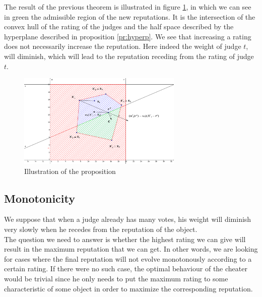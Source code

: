 \documentclass[12pt,a4paper]{article}
\begin{document}
The result of the previous theorem is illustrated in figure \ref{hyperp}, in which we can see in green the admissible region of the new reputations. It is the intersection of the convex hull of the rating of the judges and the half space described by the hyperplane described in proposition \ref{pr:hyperp}. We see that increasing a rating does not necessarily increase the reputation. Here indeed the weight of judge $t$, will diminish, which will lead to the reputation receding from the rating of judge $t$.

\begin{figure}[h!]
\centering
\includegraphics[width = 0.7\textwidth]{geogebra/Hyperplane.png}
\caption{\label{hyperp}Illustration of the proposition}
\end{figure}
\FloatBarrier

\newpage
\subsection{Monotonicity}
We suppose that when a judge already has many votes, his weight will diminish very slowly when he recedes from the reputation of the object.\\
The question we need to answer is whether the highest rating we can give will result in the maximum reputation that we can get. In other words, we are looking for cases where the final reputation will not evolve monotonously according to a certain rating. If there were no such case, the optimal behaviour of the cheater would be trivial since he only needs to put the maximum rating to some characteristic of some object in order to maximize the corresponding reputation.\\
\end{document}
